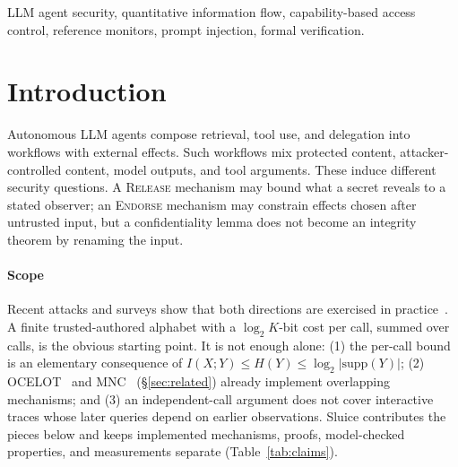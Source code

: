 \documentclass[conference,compsoc]{IEEEtran}
\newcommand{\rev}[1]{#1} %
\newcommand{\sys}{Sluice}
\begin{document}
\begin{IEEEkeywords}
LLM agent security, quantitative information flow, capability-based access control, reference monitors, prompt injection, formal verification.
\end{IEEEkeywords}





\IEEEpeerreviewmaketitle



\section{Introduction}
\label{sec:intro}

Autonomous LLM agents compose retrieval, tool use, and delegation into
workflows with external effects. Such workflows mix protected content,
attacker-controlled content, model outputs, and tool arguments. These induce
different security questions. A \textsc{Release} mechanism may bound what a
secret reveals to a stated observer; an \textsc{Endorse} mechanism may
constrain effects chosen after untrusted input, but a confidentiality lemma
does not become an integrity theorem by renaming the input.

\rev{\paragraph{Scope} Recent attacks and surveys show that both directions are exercised in practice~\cite{sokagentic2026,masleak2026}. A finite trusted-authored alphabet with a $\log_2 K$-bit cost per call, summed over calls, is the obvious starting point. It is not enough alone: (1) the per-call bound is an elementary consequence of $I(X;Y)\le H(Y)\le\log_2|\mathrm{supp}(Y)|$; (2) OCELOT~\cite{ocelot2026} and MNC~\cite{mnc2026} (\S\ref{sec:related}) already implement overlapping mechanisms; and (3) an independent-call argument does not cover interactive traces whose later queries depend on earlier observations. \sys{} contributes the pieces below and keeps implemented mechanisms, proofs, model-checked properties, and measurements separate (Table~\ref{tab:claims}).}
\end{document}
